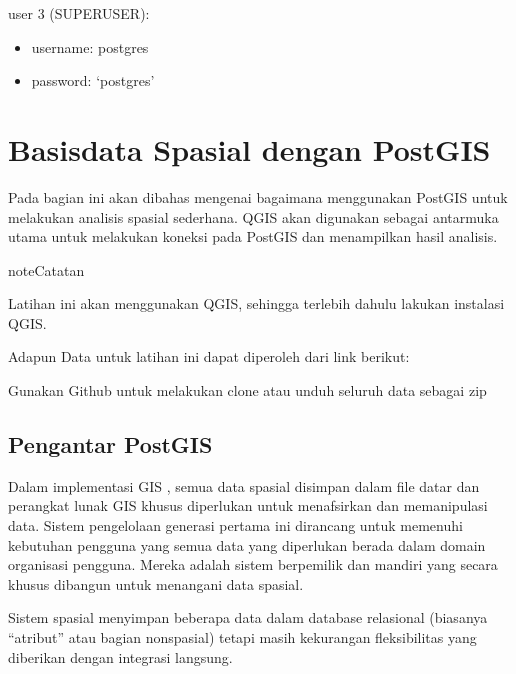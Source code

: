 \documentclass[letterpaper,10pt,english]{sphinxmanual}
\begin{document}
user 3 (SUPERUSER):
\begin{itemize}
\item {} 
username: postgres

\item {} 
password: ‘postgres’

\end{itemize}


\section{Basisdata Spasial dengan PostGIS}
\label{\detokenize{sesi2/postgisquery:basisdata-spasial-dengan-postgis}}\label{\detokenize{sesi2/postgisquery::doc}}
Pada bagian ini akan dibahas mengenai bagaimana menggunakan PostGIS untuk melakukan analisis spasial sederhana. QGIS akan digunakan sebagai antarmuka utama untuk melakukan koneksi pada PostGIS dan menampilkan hasil analisis.

\begin{sphinxadmonition}{note}{Catatan}

Latihan ini akan menggunakan QGIS, sehingga terlebih dahulu lakukan instalasi QGIS.

Adapun Data untuk latihan ini dapat diperoleh dari link berikut:


Gunakan Github untuk melakukan clone atau unduh seluruh data sebagai zip
\end{sphinxadmonition}


\subsection{Pengantar PostGIS}
\label{\detokenize{sesi2/postgisquery:pengantar-postgis}}
Dalam implementasi GIS , semua data spasial disimpan dalam file datar dan perangkat lunak GIS khusus diperlukan untuk menafsirkan dan memanipulasi data. Sistem pengelolaan generasi pertama ini dirancang untuk memenuhi kebutuhan pengguna yang semua data yang diperlukan berada dalam domain organisasi pengguna. Mereka adalah sistem berpemilik dan mandiri yang secara khusus dibangun untuk menangani data spasial.

Sistem spasial  menyimpan beberapa data dalam database relasional (biasanya “atribut” atau bagian non\sphinxhyphen{}spasial) tetapi masih kekurangan fleksibilitas yang diberikan dengan integrasi langsung.
\begin{quote}

\end{quote}
\end{document}
